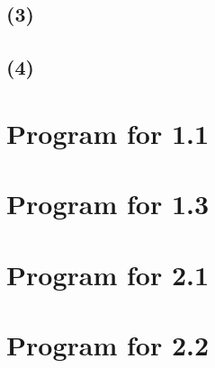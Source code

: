 \documentclass[10pt]{article}
\begin{document}
\subsection*{(3)}


\subsection*{(4)}


\newpage
\begin{appendix}
\section{Program for 1.1}
\label{a:1.1}

\newpage
\section{Program for 1.3}
\label{a:1.3}

\newpage
\section{Program for 2.1}
\label{a:2.1}

\newpage
\section{Program for 2.2}
\label{a:2.2}

\end{appendix}
\end{document}

